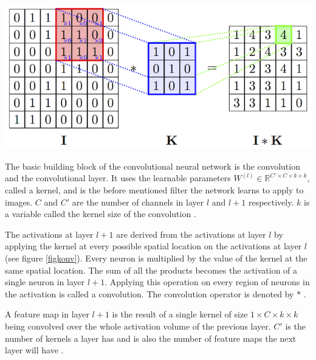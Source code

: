 \documentclass[paperwidth=48in,paperheight=48in, fontscale=0.4166666666666, landscape]{baposter}
\begin{document}
\begin{poster}
{\begin{center}
\begin{minipage}{0.9\textwidth}
\begin{center}
   \includegraphics[scale=2]{convolution.png}
    \label{figkonv}
\end{center}
\end{minipage}
\end{center}


The basic building block of the convolutional neural network is the convolution and the convolutional layer. It uses the learnable parameters $W^{(l)} \in \mathbb{R}^{C' \times C  \times k \times k}$, called a kernel, and is the before mentioned filter the network learns to apply to images. $C$ and $C'$ are the number of channels in layer $l$ and $l+1$ respectively. $k$ is a variable called the kernel size of the convolution \cite{cs231n}. 

The activations at layer $l+1$ are derived from the activations at layer $l$ by applying the kernel at every possible spatial location on the activations at layer $l$ (see figure \ref{figkonv}). Every neuron is multiplied by the value of the kernel at the same spatial location. The sum of all the products becomes the activation of a single neuron in layer $l+1$. Applying this operation on every region of neurons in the activation is called a convolution. The convolution operator is denoted by $*$ \cite{cs231n} \cite{convmath} \cite{convarithmetic}. 



A feature map in layer $l+1$ is the result of a single kernel of size $1 \times C  \times k\times k$ being convolved over the whole activation volume of the previous layer. $C'$ is the number of kernels a layer has and is also the number of feature maps the next layer will have \cite{cs231n} \cite{convmath}. 

}
\end{poster}
\end{document}
